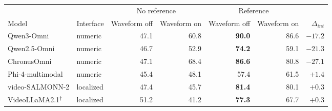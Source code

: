 \begin{tabular}{@{}llrrrrr@{}}
\toprule
& & \multicolumn{2}{c}{No reference} & \multicolumn{2}{c}{Reference} & \\
\cmidrule(lr){3-4}\cmidrule(lr){5-6}
Model & Interface & Waveform off & Waveform on & Waveform off & Waveform on & $\Delta_{int}$ \\
\midrule
Qwen3-Omni & numeric & 47.1 & 60.8 & \textbf{90.0} & 86.6 & $-17.2$ \\
Qwen2.5-Omni & numeric & 46.7 & 52.9 & \textbf{74.2} & 59.1 & $-21.3$ \\
ChronusOmni & numeric & 47.1 & 68.4 & \textbf{86.6} & 80.8 & $-27.1$ \\
Phi-4-multimodal & numeric & 45.4 & 48.1 & 57.4 & 61.5 & $+1.4$ \\
video-SALMONN-2 & localized & 47.4 & 45.7 & \textbf{81.4} & 80.1 & $+0.3$ \\
VideoLLaMA2.1$^\dagger$ & localized & 51.2 & 41.2 & \textbf{77.3} & 67.7 & $+0.3$ \\
\bottomrule
\end{tabular}
